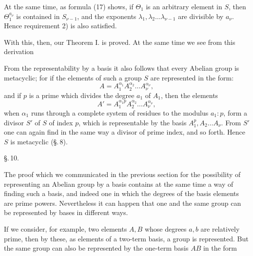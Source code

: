 At the same time, as formula (17) shows, if $\Theta_1$ is an arbitrary element in $S$, then $\Theta_1^{a_\nu}$ is contained in $S_{\nu-1}$, and the exponents $\lambda_1, \lambda_2 \ldots \lambda_{\nu-1}$ are divisible by $a_\nu$. Hence requirement 2) is also satisfied.

With this, then, our Theorem I. is proved. At the same time we see from this derivation 

From the representability by a basis it also follows that every Abelian group is metacyclic; for if the elements of such a group $S$ are represented in the form:
\[
A = A_1^{\alpha_1} A_2^{\alpha_2} \ldots A_\nu^{\alpha_\nu},
\]
and if $p$ is a prime which divides the degree $a_1$ of $A_1$, then the elements
\[
A' = A_1^{\alpha_1 p} A_2^{\alpha_2} \ldots A_\nu^{\alpha_\nu},
\]
when $\alpha_1$ runs through a complete system of residues to the modulus $a_1 : p$, form a divisor $S'$ of $S$ of index $p$, which is representable by the basis $A_1^p, A_2 \ldots A_\nu$. From $S'$ one can again find in the same way a divisor of prime index, and so forth. Hence $S$ is metacyclic (\S.\,8).

\begin{center}
\S.\,10.

\end{center}

The proof which we communicated in the previous section for the possibility of representing an Abelian group by a basis contains at the same time a way of finding such a basis, and indeed one in which the degrees of the basis elements are prime powers. Nevertheless it can happen that one and the same group can be represented by bases in different ways.

If we consider, for example, two elements $A, B$ whose degrees $a, b$ are relatively prime, then by these, as elements of a two-term basis, a group
is represented. But the same group can also be represented by the one-term basis $AB$ in the form
